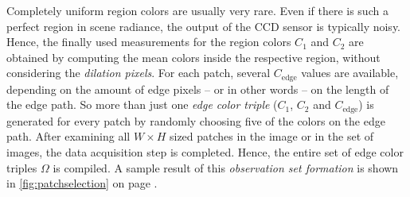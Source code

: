 Completely uniform region colors are usually very rare. Even if there is such a perfect region in scene radiance, the output of the CCD sensor is typically noisy. Hence, the finally used measurements for the region colors $C_1$ and $C_2$ are obtained by computing the mean colors inside the respective region, without considering the \emph{dilation pixels}. For each patch, several $C_{\text{edge}}$ values are available, depending on the amount of edge pixels -- or in other words -- on the length of the edge path. So more than just one \emph{edge color triple} ($C_1$, $C_2$ and $C_{\text{edge}}$) is generated for every patch by randomly choosing five of the colors on the edge path. After examining all $W \times H$ sized patches in the image or in the set of images, the data acquisition step is completed. Hence, the entire set of edge color triples $\Omega$ is compiled. A sample result of this \emph{observation set formation} is shown in \autoref{fig:patchselection} on page \pageref{fig:patchselection}. 

